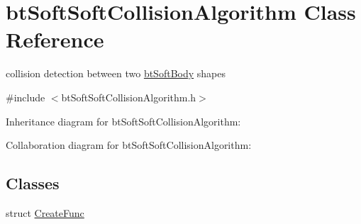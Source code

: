 \hypertarget{classbt_soft_soft_collision_algorithm}{\section{bt\+Soft\+Soft\+Collision\+Algorithm Class Reference}
\label{classbt_soft_soft_collision_algorithm}
}


collision detection between two \hyperlink{classbt_soft_body}{bt\+Soft\+Body} shapes  




{\ttfamily \#include $<$bt\+Soft\+Soft\+Collision\+Algorithm.\+h$>$}



Inheritance diagram for bt\+Soft\+Soft\+Collision\+Algorithm\+:


Collaboration diagram for bt\+Soft\+Soft\+Collision\+Algorithm\+:
\subsection*{Classes}
\begin{DoxyCompactItemize}
\item 
struct \hyperlink{structbt_soft_soft_collision_algorithm_1_1_create_func}{Create\+Func}
\end{DoxyCompactItemize}
